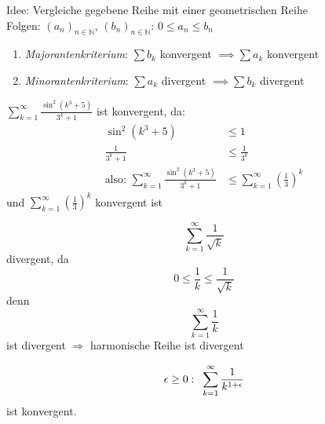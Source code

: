 Idee: Vergleiche gegebene Reihe mit einer geometrischen Reihe\\
Folgen: $ (a_n)_{n \in \mathbb{N}} $, $ (b_n)_{n \in \mathbb{N}} $: $ 0 \leq a_n \leq b_n$

\begin{enumerate}
    \item \emph{Majorantenkriterium}: $\sum b_k$ konvergent $\implies \sum a_k$ konvergent
    \item \emph{Minorantenkriterium}: $\sum a_k$ divergent $\implies \sum b_k$ divergent
\end{enumerate}

\begin{example}[Konvergenz]
    $ \sum_{k=1}^{\infty} \frac{\sin^2 \left( k^3 + 5 \right) }{3^k + 1} $ ist konvergent, da:
    \begin{align*}
        \sin^2 \left(k^3 + 5 \right) &\leq 1 \\
        \frac{1}{3^k+1} &\leq \frac{1}{3^k} \\
        \text{also: } \sum_{k=1}^{\infty} \frac{\sin^2 \left( k^3 + 5 \right) }{3^k + 1} &\leq \sum_{k=1}^{\infty} \left( \frac{1}{3} \right)^k
    \end{align*}
    und $\sum_{k=1}^{\infty} \left( \frac{1}{3} \right)^k$ konvergent ist
\end{example}

\begin{example}[Divergenz]
    \begin{equation*} \sum_{k=1}^{\infty} \frac{1}{\sqrt{k}} \end{equation*} divergent, da \begin{equation*} 0 \leq \frac{1}{k} \leq \frac{1}{\sqrt{k}} \end{equation*}
    denn \begin{equation*}\sum_{k=1}^{\infty} \frac{1}{k}\end{equation*} ist divergent $\Rightarrow$ harmonische Reihe ist divergent
\end{example}

\begin{note}
    \begin{equation*}
        \epsilon \ge 0: \hspace{5px} \sum_{k=1}^{\infty} \frac{1}{k^{1+\epsilon}}
    \end{equation*}
    ist konvergent.
\end{note}

